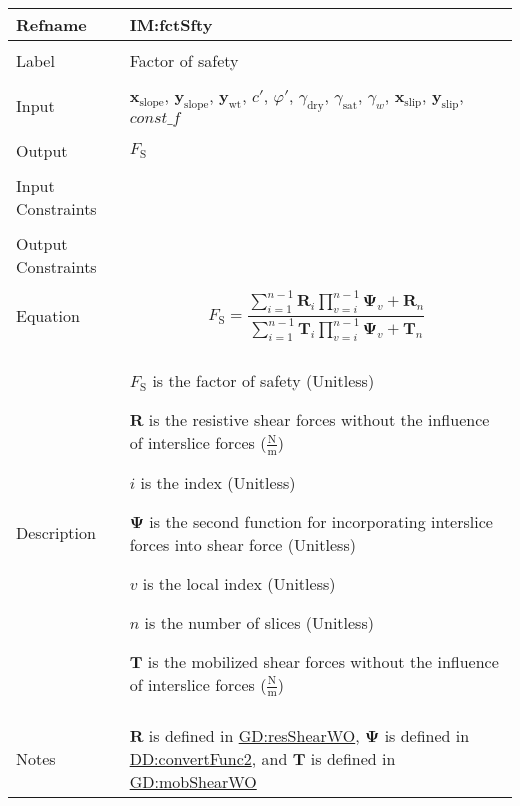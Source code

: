 \documentclass[12pt]{article}
\begin{document}
\vspace{\baselineskip}
\noindent
\begin{minipage}{\textwidth}
\begin{tabular}{>{\raggedright}p{}>{\raggedright\arraybackslash}p{}}
\toprule \textbf{Refname} & \textbf{IM:fctSfty}
\label{IM:fctSfty}
\\ \midrule \\
Label & Factor of safety
        
\\ \midrule \\
Input & ${\symbf{x}_{\text{slope}}}$, ${\symbf{y}_{\text{slope}}}$, ${\symbf{y}_{\text{wt}}}$, $c'$, $φ'$, ${γ_{\text{dry}}}$, ${γ_{\text{sat}}}$, ${γ_{w}}$, ${\symbf{x}_{\text{slip}}}$, ${\symbf{y}_{\text{slip}}}$, $\mathit{const\_f}$
        
\\ \midrule \\
Output & ${F_{\text{S}}}$
         
\\ \midrule \\
Input Constraints & 
\\ \midrule \\
Output Constraints & 
\\ \midrule \\
Equation & \begin{displaymath}
           {F_{\text{S}}}=\frac{\displaystyle\sum_{i=1}^{n-1}{{\symbf{R}}_{i} \displaystyle\prod_{v=i}^{n-1}{{\symbf{Ψ}}_{v}}}+{\symbf{R}}_{n}}{\displaystyle\sum_{i=1}^{n-1}{{\symbf{T}}_{i} \displaystyle\prod_{v=i}^{n-1}{{\symbf{Ψ}}_{v}}}+{\symbf{T}}_{n}}
           \end{displaymath}
\\ \midrule \\
Description & \begin{symbDescription}
              \item{${F_{\text{S}}}$ is the factor of safety (Unitless)}
              \item{$\symbf{R}$ is the resistive shear forces without the influence of interslice forces ($\frac{\text{N}}{\text{m}}$)}
              \item{$i$ is the index (Unitless)}
              \item{$\symbf{Ψ}$ is the second function for incorporating interslice forces into shear force (Unitless)}
              \item{$v$ is the local index (Unitless)}
              \item{$n$ is the number of slices (Unitless)}
              \item{$\symbf{T}$ is the mobilized shear forces without the influence of interslice forces ($\frac{\text{N}}{\text{m}}$)}
              \end{symbDescription}
\\ \midrule \\
Notes & $\symbf{R}$ is defined in \hyperref[GD:resShearWO]{GD:resShearWO}, $\symbf{Ψ}$ is defined in \hyperref[DD:convertFunc2]{DD:convertFunc2}, and $\symbf{T}$ is defined in \hyperref[GD:mobShearWO]{GD:mobShearWO}
        

\end{tabular}
\end{minipage}
\end{document}
